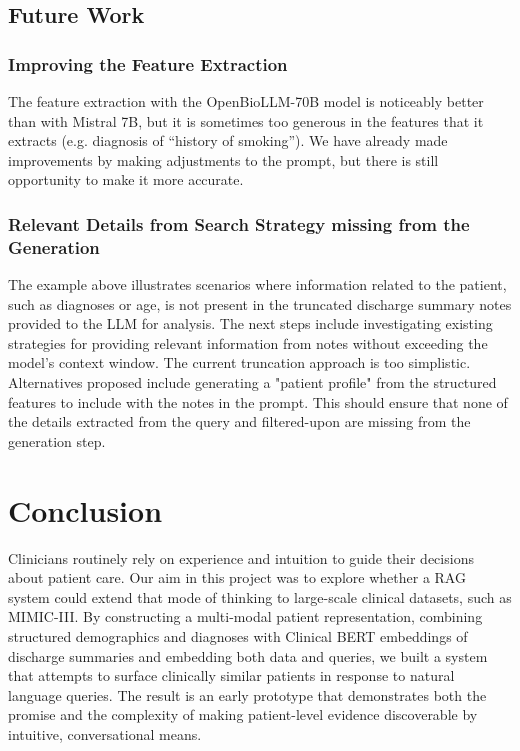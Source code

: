 \documentclass[acmtog]{acmart}
\begin{document}
\subsection{Future Work}

\subsubsection{Improving the Feature Extraction}
The feature extraction with the OpenBioLLM-70B model is noticeably better than with Mistral 7B, but it is sometimes too generous in the features that it extracts (e.g. diagnosis of ``history of smoking''). We have already made improvements by making adjustments to the prompt, but there is still opportunity to make it more accurate.

\subsubsection{Relevant Details from Search Strategy missing from the Generation}
The example above illustrates scenarios where information related to the patient, such as diagnoses or age, is not present in the truncated discharge summary notes provided to the LLM for analysis. The next steps include investigating existing strategies for providing relevant information from notes without exceeding the model's context window. The current truncation approach is too simplistic. Alternatives proposed include generating a "patient profile" from the structured features to include with the notes in the prompt. This should ensure that none of the details extracted from the query and filtered-upon are missing from the generation step.

\section{Conclusion}

Clinicians routinely rely on experience and intuition to guide their decisions about patient care. Our aim in this project was to explore whether a RAG system could extend that mode of thinking to large-scale clinical datasets, such as MIMIC-III. By constructing a multi-modal patient representation, combining structured demographics and diagnoses with Clinical BERT embeddings of discharge summaries and embedding both data and queries, we built a system that attempts to surface clinically similar patients in response to natural language queries. The result is an early prototype that demonstrates both the promise and the complexity of making patient-level evidence discoverable by intuitive, conversational means.
\end{document}
